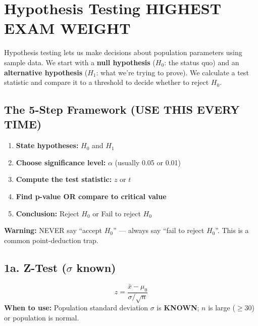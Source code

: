 \documentclass[11pt, letterpaper]{article}
\newcommand{\warn}[1]{\begin{warningbox}\textbf{Warning:} #1\end{warningbox}}
\begin{document}
\newpage
\hypertarget{sec:hyp}{}
\section{Hypothesis Testing \hfill \textcolor{warningred}{\small HIGHEST EXAM WEIGHT}}

Hypothesis testing lets us make decisions about population parameters using sample data. We start with a \textbf{null hypothesis} ($H_0$: the status quo) and an \textbf{alternative hypothesis} ($H_1$: what we're trying to prove). We calculate a test statistic and compare it to a threshold to decide whether to reject $H_0$.

\subsection{The 5-Step Framework (USE THIS EVERY TIME)}
\begin{enumerate}
  \item \textbf{State hypotheses:} $H_0$ and $H_1$
  \item \textbf{Choose significance level:} $\alpha$ (usually 0.05 or 0.01)
  \item \textbf{Compute the test statistic:} $z$ or $t$
  \item \textbf{Find p-value OR compare to critical value}
  \item \textbf{Conclusion:} Reject $H_0$ or Fail to reject $H_0$
\end{enumerate}

\warn{NEVER say ``accept $H_0$'' --- always say ``fail to reject $H_0$''. This is a common point-deduction trap.}

\subsection{1a. Z-Test ($\sigma$ known)}

\begin{formulabox}
\[ z = \frac{\bar{x} - \mu_0}{\sigma / \sqrt{n}} \]
\textbf{When to use:} Population standard deviation $\sigma$ is \textbf{KNOWN}; $n$ is large ($\geq 30$) or population is normal.
\end{formulabox}
\end{document}

